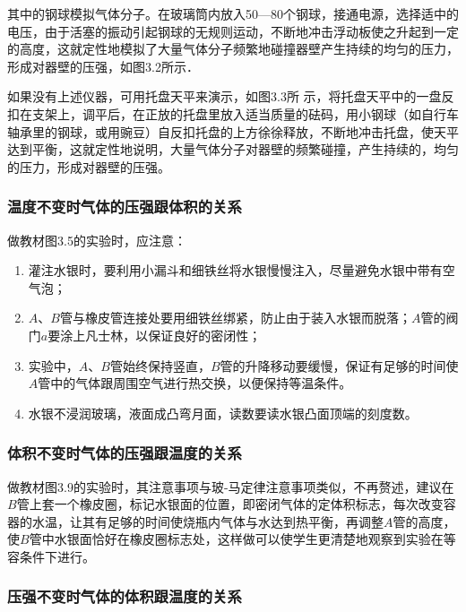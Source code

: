 其中的钢球模拟气体分子。在玻璃筒内放入50—80个钢球，接通电源，选择适中的电压，由于活塞的振动引起钢球的无规则运动，不断地冲击浮动板使之升起到一定的高度，这就定性地模拟了大量气体分子频繁地碰撞器壁产生持续的均匀的压力，形成对器壁的压强，如图3.2所示．

\begin{figure}[htp]
    \centering
    \caption{}
\end{figure}

如果没有上述仪器，可用托盘天平来演示，如图3.3所
示，将托盘天平中的一盘反扣在支架上，调平后，在正放的托盘里放入适当质量的砝码，用小钢球（如自行车轴承里的钢球，或用豌豆）自反扣托盘的上方徐徐释放，不断地冲击托盘，使天平达到平衡，这就定性地说明，大量气体分子对器壁的频繁碰撞，产生持续的，均匀的压力，形成对器壁的压强。

\subsubsection{温度不变时气体的压强跟体积的关系}

做教材图3.5的实验时，应注意：
\begin{enumerate}
\item 灌注水银时，要利用小漏斗和细铁丝将水银慢慢注入，尽量避免水银中带有空气泡；
\item $A$、$B$管与橡皮管连接处要用细铁丝绑紧，防止由于装入水银而脱落；$A$管的阀门$a$要涂上凡士林，以保证良好的密闭性；
\item 实验中，$A$、$B$管始终保持竖直，$B$管的升降移动要缓慢，保证有足够的时间使$A$管中的气体跟周围空气进行热交换，以便保持等温条件。
\item 水银不浸润玻璃，液面成凸弯月面，读数要读水银凸面顶端的刻度数。
\end{enumerate}

\subsubsection{体积不变时气体的压强跟温度的关系}

做教材图3.9的实验时，其注意事项与玻-马定律注意事项类似，不再赘述，建议在$B$管上套一个橡皮圈，标记水银面的位置，即密闭气体的定体积标志，每次改变容器的水温，让其有足够的时间使烧瓶内气体与水达到热平衡，再调整$A$管的高度，使$B$管中水银面恰好在橡皮圈标志处，这样做可以使学生更清楚地观察到实验在等容条件下进行。

\subsubsection{压强不变时气体的体积跟温度的关系}


